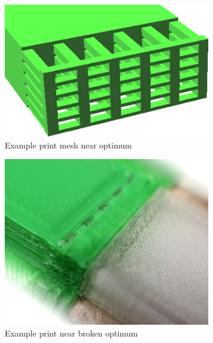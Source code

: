 \begin{figure}
	\centering
	\begin{subfigure}[B]{.24\columnwidth}
		\centering
		\includegraphics[width=\columnwidth]{sources-testing-straight_sample.jpg}
		\caption{Example print mesh near optimum}
		\label{interlocking:fig:test_straight_boundary_cells}
	\end{subfigure}
	\begin{subfigure}[B]{.24\columnwidth}
		\centering
		\includegraphics[width=\columnwidth]{sources-testing-straight_print.jpg}
		\caption{Example print near broken optimum}
	\end{subfigure}
	\begin{subfigure}[B]{.5\columnwidth}
		\centering

\end{subfigure}
\end{figure}
